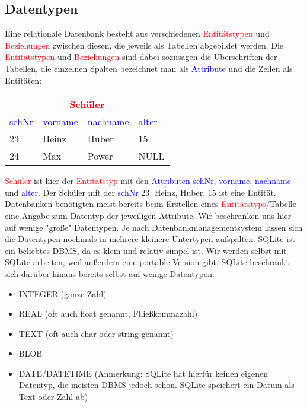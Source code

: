 \subsection{Datentypen}
Eine relationale Datenbank besteht aus verschiedenen \textcolor{red}{Entitätstypen} und \textcolor{red}{Beziehungen} zwischen diesen, die jeweils als Tabellen abgebildet werden. Die \textcolor{red}{Entitätstypen} und \textcolor{red}{Beziehungen} sind dabei sozusagen die Überschriften der Tabellen, die einzelnen Spalten bezeichnet man als \textcolor{blue}{Attribute} und die Zeilen als Entitäten:

\begin{table}[h]
	\centering
	\begin{tabular}{llll}
		\multicolumn{4}{c}{\textcolor{red}{\textbf{Schüler}}}\\
		\textcolor{blue}{\underline{schNr}} 	& \textcolor{blue}{vorname} 	& \textcolor{blue}{nachname}	& \textcolor{blue}{alter}  \\
		\midrule
		23&Heinz&Huber&15\\
		24&Max&Power&NULL\\
	\end{tabular}
\end{table}
\textcolor{red}{Schüler} ist hier der \textcolor{red}{Entitätstyp} mit den \textcolor{blue}{Attributen schNr, vorname, nachname} und \textcolor{blue}{alter}. Der Schüler mit der \textcolor{blue}{schNr} 23, Heinz, Huber, 15 ist eine Entität.
Datenbanken benötigten meist bereits beim Erstellen eines \textcolor{red}{Entitätstyps}/Tabelle eine Angabe zum Datentyp der jeweiligen Attribute. Wir beschränken uns hier auf wenige "große" Datentypen. Je nach Datenbankmanagementsystem lassen sich die Datentypen nochmals in mehrere kleinere Untertypen aufspalten.
SQLite ist ein beliebtes DBMS, da es klein und relativ simpel ist. Wir werden selbst mit SQLite arbeiten, weil außerdem eine portable Version gibt. SQLite beschränkt sich darüber hinaus bereits selbst auf wenige Datentypen:
\begin{tcolorbox}[title=Datentypen]
	\begin{itemize}
		\item INTEGER (ganze Zahl)
		\item REAL (oft auch float genannt, Flließkommazahl)
		\item TEXT (oft auch char oder string genannt)
		\item BLOB
		\item DATE/DATETIME (Anmerkung: SQLite hat hierfür keinen eigenen Datentyp, die meisten DBMS jedoch schon. SQLite speichert ein Datum als Text oder Zahl ab)
	\end{itemize}
\end{tcolorbox}

